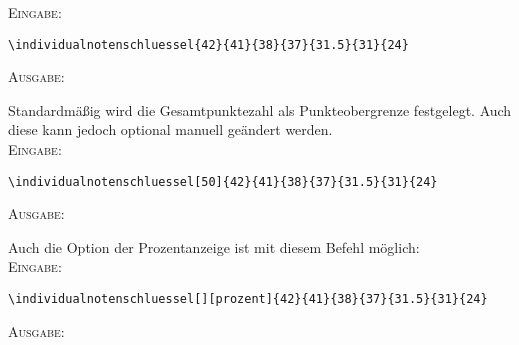 \documentclass[a4paper,12pt]{article}
\begin{document}
\textsc{Eingabe:}
\begin{verbatim}
\individualnotenschluessel{42}{41}{38}{37}{31.5}{31}{24}
\end{verbatim}

\textsc{Ausgabe:}

Standardmäßig wird die Gesamtpunktezahl als Punkteobergrenze festgelegt. Auch diese kann jedoch optional manuell geändert werden.\\

\textsc{Eingabe:}
\begin{verbatim}
\individualnotenschluessel[50]{42}{41}{38}{37}{31.5}{31}{24}
\end{verbatim}

\textsc{Ausgabe:}

Auch die Option der Prozentanzeige ist mit diesem Befehl möglich:\\

\textsc{Eingabe:}
\begin{verbatim}
\individualnotenschluessel[][prozent]{42}{41}{38}{37}{31.5}{31}{24}
\end{verbatim}

\textsc{Ausgabe:}

%
%

%
%
%
\end{document}
